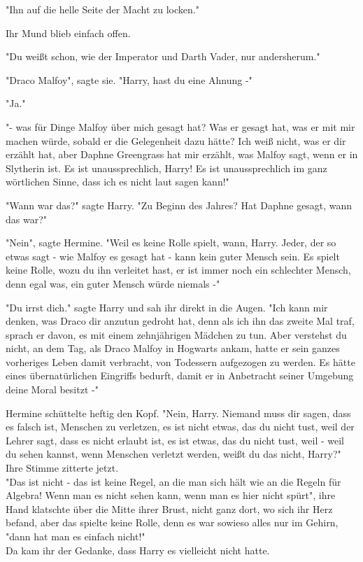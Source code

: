 {"Ihn auf die helle Seite der Macht zu locken."

Ihr Mund blieb einfach offen.

"Du weißt schon, wie der Imperator und Darth Vader, nur andersherum."

"Draco Malfoy", sagte sie. "Harry, hast du eine Ahnung -"

"Ja."

"- was für Dinge Malfoy über mich gesagt hat? Was er gesagt hat, was er mit mir machen würde, sobald er die Gelegenheit dazu hätte? Ich weiß nicht, was er dir erzählt hat, aber Daphne Greengrass hat mir erzählt, was Malfoy sagt, wenn er in Slytherin ist. Es ist unaussprechlich, Harry! Es ist unaussprechlich im ganz wörtlichen Sinne, dass ich es nicht laut sagen kann!"

"Wann war das?" sagte Harry. "Zu Beginn des Jahres? Hat Daphne gesagt, wann das war?"

"Nein", sagte Hermine. "Weil es keine Rolle spielt, wann, Harry. Jeder, der so etwas sagt - wie Malfoy es gesagt hat - kann kein guter Mensch sein. Es spielt keine Rolle, wozu du ihn verleitet hast, er ist immer noch ein schlechter Mensch, denn egal was, ein guter Mensch würde niemals -"

"Du irrst dich." sagte Harry und sah ihr direkt in die Augen. "Ich kann mir denken, was Draco dir anzutun gedroht hat, denn als ich ihn das zweite Mal traf, sprach er davon, es mit einem zehnjährigen Mädchen zu tun. Aber verstehst du nicht, an dem Tag, als Draco Malfoy in Hogwarts ankam, hatte er sein ganzes vorheriges Leben damit verbracht, von Todessern aufgezogen zu werden. Es hätte eines übernatürlichen Eingriffs bedurft, damit er in Anbetracht seiner Umgebung deine Moral besitzt -"

Hermine schüttelte heftig den Kopf. "Nein, Harry. Niemand muss dir sagen, dass es falsch ist, Menschen zu verletzen, es ist nicht etwas, das du nicht tust, weil der Lehrer sagt, dass es nicht erlaubt ist, es ist etwas, das du nicht tust, weil - weil du sehen kannst, wenn Menschen verletzt werden, weißt du das nicht, Harry?"\\ Ihre Stimme zitterte jetzt.\\ "Das ist nicht - das ist keine Regel, an die man sich hält wie an die Regeln für Algebra! Wenn man es nicht sehen kann, wenn man es hier nicht spürt", ihre Hand klatschte über die Mitte ihrer Brust, nicht ganz dort, wo sich ihr Herz befand, aber das spielte keine Rolle, denn es war sowieso alles nur im Gehirn, "dann hat man es einfach nicht!"\\ Da kam ihr der Gedanke, dass Harry es vielleicht nicht hatte.

}
